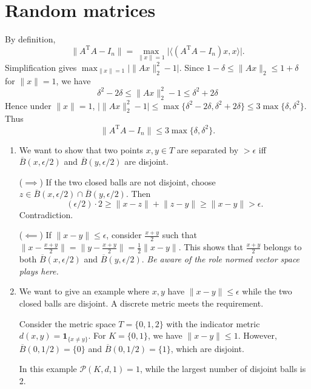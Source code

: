 \documentclass[11pt]{article}
\newcommand{\inp}[2]{\langle #1, #2 \rangle}
\newcommand{\nm}[1]{\lVert #1 \rVert}
\newcommand{\abs}[1]{\lvert #1 \rvert}
\newcommand{\ol}[1]{\overline{#1}}
\newcommand{\trp}{\mathrm T}
\newcommand{\I}[1]{\mathbf{1}_{\{#1\}}}
\theoremstyle{plain}
\theoremstyle{definition}
\theoremstyle{remark}
\theoremstyle{definition}
\newenvironment{mansol}[1]{%
  \renewcommand\themansolinner{#1}%
  \mansolinner
}{\endmansolinner}
\begin{document}
\newpage
\section{Random matrices}
\begin{mansol}{4.1.6}
By definition, \[\nm{A^\trp A - I_n} = \max_{\nm{x} = 1} \abs{\inp{(A^\trp A - I_n) x}{x}}.\]
Simplification gives $\max_{\nm{x} = 1} \big\lvert\nm{Ax}_2^2 - 1\big\rvert$. Since $1 - \delta \leq \nm{Ax}_2 \leq 1 + \delta$ for $\nm{x} = 1$, we have \[
\delta^2 - 2 \delta \leq \nm{Ax}_2^2 - 1 \leq \delta^2 + 2 \delta
\]
Hence under $\nm{x} = 1$, $\big\lvert\nm{Ax}_2^2 - 1\big\rvert \leq \max\{\delta^2 - 2\delta, \delta^2 + 2 \delta\} \leq 3 \max\{\delta, \delta^2\}$. Thus \[\nm{A^\trp A - I_n} \leq 3 \max\{\delta,\delta^2\}.\]
\end{mansol}

\begin{mansol}{4.2.5}\label{ep-sep-equiv}
\begin{enumerate}[label=(\alph*)]
\item We want to show that two points $x,y \in T$ are separated by $> \epsilon$ iff $\ol{B}(x,\epsilon/2)$ and $\ol{B}(y,\epsilon/2)$ are disjoint.

($\implies$) If the two closed balls are not disjoint, choose $z \in \ol{B}(x,\epsilon/2) \cap \ol{B}(y,\epsilon/2)$. Then \[(\epsilon/2)\cdot 2 \geq \nm{x - z} + \nm{z - y} \geq \nm{x - y} > \epsilon.\] Contradiction.

($\impliedby$) If $\nm{x-y} \leq \epsilon$, consider $\frac{x+y}{2}$ such that $\bigl\lVert x - \frac{x+y}{2} \bigr\rVert = \bigl\lVert y - \frac{x+y}{2} \bigr\rVert = \frac{1}{2}\nm{x-y}$. This shows that $\frac{x+y}{2}$ belongs to both $\ol{B}(x,\epsilon/2)$ and $\ol{B}(y,\epsilon/2)$. \emph{Be aware of the role normed vector space plays here.}

\item We want to give an example where $x,y$ have $\nm{x-y} \leq \epsilon$ while the two closed balls are disjoint. A discrete metric meets the requirement.

Consider the metric space $T = \{0,1,2\}$ with the indicator metric $d(x,y) = \I{x\neq y}$. For $K = \{0,1\}$, we have $\nm{x-y} \leq 1$. However, $\ol{B}(0,1/2) = \{0\}$ and $\ol{B}(0,1/2) = \{1\}$, which are disjoint.

In this example $\mathcal{P}(K,d,1) = 1$, while the largest number of disjoint balls is 2.
\end{enumerate}
\end{mansol}
\end{document}
